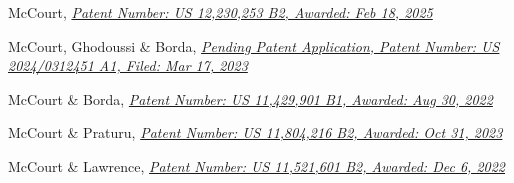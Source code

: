 \begin{patnumerate}
%
\item \begin{minipage}[t]{\textwidth} McCourt, \href{https://patents.google.com/patent/US12230253B2}{\textit{Patent Number: US 12,230,253 B2, Awarded: Feb 18, 2025}}\\
  \end{minipage}

\item \begin{minipage}[t]{\textwidth} McCourt, Ghodoussi \& Borda, \href{https://patents.google.com/patent/US20240312451A1}{\textit{Pending Patent Application, Patent Number: US 2024/0312451 A1, Filed: Mar 17, 2023}}\\
  \end{minipage}

\item \begin{minipage}[t]{\textwidth} McCourt \& Borda, \href{https://patents.google.com/patent/US11429901B1}{\textit{Patent Number: US 11,429,901 B1, Awarded: Aug 30, 2022}}\\
  \end{minipage}

\item \begin{minipage}[t]{\textwidth} McCourt \& Praturu, \href{https://patents.google.com/patent/US11804216}{\textit{Patent Number: US 11,804,216 B2, Awarded: Oct 31, 2023}}\\
  \end{minipage}

\item \begin{minipage}[t]{\textwidth} McCourt \& Lawrence, \href{https://patents.google.com/patent/US11521601B2}{\textit{Patent Number: US 11,521,601 B2, Awarded: Dec 6, 2022}}\\
  \end{minipage}


\end{patnumerate}
